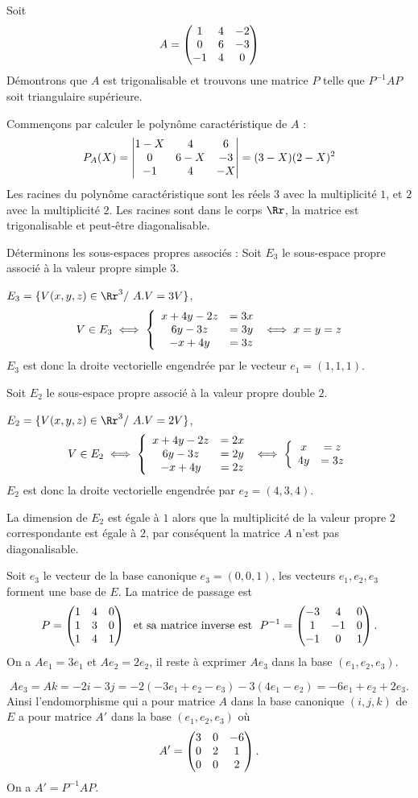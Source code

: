 \documentclass[class=report,crop=false]{standalone}
\begin{document}
\begin{exemple}
Soit $$A=\left(\begin{matrix}1&4&-2\cr0&6&-3\cr-1&4&0\end{matrix}\right)$$
Démontrons que $A$ est trigonalisable et trouvons une matrice $P$ telle que $P^{-1}AP$ soit triangulaire supérieure.

Commençons par calculer le polynôme caractéristique de $A$ :
$$P_A(X)=\left|\begin{matrix}1-X&4&6\cr 0&6-X&-3\cr-1&4&-X\end{matrix}\right|=(3-X)(2-X)^2$$
Les racines du polynôme caractéristique sont les réels $3$ avec la multiplicité $1$, et $2$ avec la multiplicité $2$. Les racines sont dans le corps $\Rr$, la matrice est trigonalisable et peut-être diagonalisable.

Déterminons les sous-espaces propres associés : Soit $E_3$ le sous-espace propre associé à la valeur propre simple $3$.

$E_3=\{V(x,y,z)\in\Rr^3/\ A.V=3V\}$, 
$$V\in E_3\iff \left\{\begin{array}{cc}x+4y-2z&=3x\cr 6y-3z&=3y\cr -x+4y&=3z\end{array}\right.\iff x=y=z$$
$E_3$ est donc la droite vectorielle engendrée par le vecteur $e_1=(1,1,1)$.

Soit $E_2$ le sous-espace propre associé à la valeur propre double $2$.

$E_2=\{V(x,y,z)\in\Rr^3/\ A.V=2V\}$, 
$$V\in E_2\iff \left\{\begin{array}{cc}x+4y-2z&=2x\cr 6y-3z&=2y\cr -x+4y&=2z\end{array}\right.\iff \left\{\begin{array}{cc}x&=z\cr 4y&=3z\end{array}\right.$$
$E_2$ est donc la droite vectorielle engendrée par $e_2=(4,3,4)$.

La dimension de $E_2$ est égale à $1$ alors que la multiplicité de la valeur propre $2$ correspondante est égale à $2$, par conséquent la matrice $A$ n'est pas diagonalisable.

Soit $e_3$ le vecteur de la base canonique $e_3=(0,0, 1)$, les vecteurs $ e_1, e_2, e_3$ forment une base de $E$. La matrice de passage est $$P=\left(\begin{matrix}1&4&0\cr 1&3&0\cr 1&4&1\end{matrix}\right)\ \  {\hbox{et sa matrice inverse est}}\ \ 
P^{-1}=\left(\begin{matrix}-3&4&0\cr 1&-1&0\cr -1&0&1\end{matrix}\right).$$ 
On a $Ae_1=3e_1$ et $Ae_2=2e_2$, il reste à exprimer $Ae_3$ dans la base $(e_1, e_2, e_3)$.


$$Ae_3=Ak=-2i-3j=-2(-3e_1+e_2-e_3)-3(4e_1-e_2)=-6e_1+e_2+2e_3.$$
Ainsi l'endomorphisme qui a pour matrice $A$ dans la base canonique $(i,j,k)$ de $E$ a pour matrice $A'$ dans la base
$(e_1, e_2, e_3)$ où
$$A'=\left(\begin{matrix}3&0&-6\cr 0&2&1\cr 0&0&2\end{matrix}\right).$$
On a $A'=P^{-1}AP$.
\end{exemple}
\end{document}
